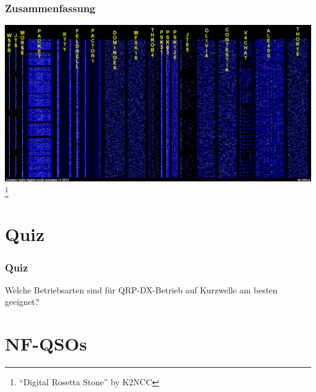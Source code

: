 \begin{frame}
    \frametitle{Zusammenfassung}

    \begin{center}
        \includegraphics[width=.85\textwidth,height=.85\textheight,keepaspectratio]{e16/Digital_Rosetta_Stone.jpg}
        \footnote{``Digital Rosetta Stone'' by K2NCC}
    \end{center}

\end{frame}

\section{Quiz}

\begin{frame}
    \frametitle{Quiz}

    \begin{exampleblock}{Welche Betriebsarten sind für QRP-DX-Betrieb auf Kurzwelle am
    besten geeignet?}
    \end{exampleblock}



\end{frame}

\section{NF-QSOs}

